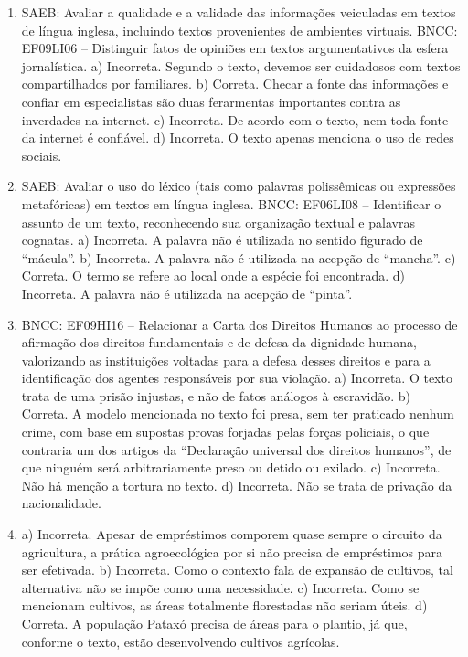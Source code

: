 \begin{enumerate}
\item
SAEB: Avaliar a qualidade e a validade das informações veiculadas em
textos de língua inglesa, incluindo textos provenientes de ambientes
virtuais. BNCC: EF09LI06 -- Distinguir fatos de opiniões em textos
argumentativos da esfera jornalística.
a) Incorreta. Segundo o texto, devemos ser cuidadosos com textos
compartilhados por familiares. b) Correta. Checar a fonte das
informações e confiar em especialistas são duas ferarmentas importantes
contra as inverdades na internet. c) Incorreta. De acordo com o texto,
nem toda fonte da internet é confiável. d) Incorreta. O texto apenas
menciona o uso de redes sociais.

\item
SAEB: Avaliar o uso do léxico (tais como palavras polissêmicas ou
expressões metafóricas) em textos em língua inglesa. BNCC: EF06LI08 --
Identificar o assunto de um texto, reconhecendo sua organização textual
e palavras cognatas.
a) Incorreta. A palavra não é utilizada no sentido figurado de
``mácula''. b) Incorreta. A palavra não é utilizada na acepção de
``mancha''. c) Correta. O termo se refere ao local onde a espécie foi
encontrada. d) Incorreta. A palavra não é utilizada na acepção de
``pinta''.

\item
BNCC: EF09HI16 -- Relacionar a Carta dos Direitos Humanos ao processo de
afirmação dos direitos fundamentais e de defesa da dignidade humana,
valorizando as instituições voltadas para a defesa desses direitos e
para a identificação dos agentes responsáveis por sua violação.
a) Incorreta. O texto trata de uma prisão injustas, e não de fatos
análogos à escravidão.
b) Correta. A modelo mencionada no texto foi presa, sem ter praticado
nenhum crime, com base em supostas provas forjadas pelas forças policiais, o
que contraria um dos artigos da ``Declaração universal dos direitos
humanos'', de que ninguém será arbitrariamente preso ou detido ou
exilado.
c) Incorreta. Não há menção a tortura no texto.
d) Incorreta. Não se trata de privação da nacionalidade.

\item
a) Incorreta. Apesar de empréstimos comporem quase sempre o circuito da
agricultura, a prática agroecológica por si não precisa de empréstimos
para ser efetivada.
b) Incorreta. Como o contexto fala de expansão de cultivos, tal alternativa
não se impõe como uma necessidade.
c) Incorreta. Como se mencionam cultivos, as áreas totalmente florestadas
não seriam úteis.
d) Correta. A população Pataxó precisa de áreas para o plantio, já que,
conforme o texto, estão desenvolvendo cultivos agrícolas.


\end{enumerate}
